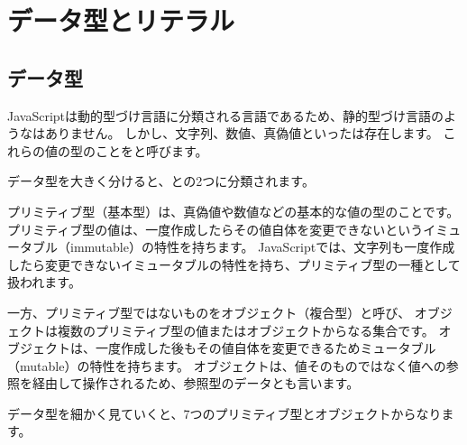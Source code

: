\hypertarget{data-type-and-literal}{%
\chapter{データ型とリテラル}\label{data-type-and-literal}}
\thispagestyle{frontheadings}

\hypertarget{data-type}{%
\section{データ型}\label{data-type}}

JavaScriptは動的型づけ言語に分類される言語であるため、静的型づけ言語のような\textbf{}はありません。
しかし、文字列、数値、真偽値といった\textbf{}は存在します。
これらの値の型のことを\textbf{}と呼びます。

データ型を大きく分けると、\textbf{}と\textbf{}の2つに分類されます。

プリミティブ型（基本型）は、真偽値や数値などの基本的な値の型のことです。
プリミティブ型の値は、一度作成したらその値自体を変更できないというイミュータブル（immutable）の特性を持ちます。
JavaScriptでは、文字列も一度作成したら変更できないイミュータブルの特性を持ち、プリミティブ型の一種として扱われます。

一方、プリミティブ型ではないものをオブジェクト（複合型）と呼び、
オブジェクトは複数のプリミティブ型の値またはオブジェクトからなる集合です。
オブジェクトは、一度作成した後もその値自体を変更できるためミュータブル（mutable）の特性を持ちます。
オブジェクトは、値そのものではなく値への参照を経由して操作されるため、参照型のデータとも言います。

データ型を細かく見ていくと、7つのプリミティブ型とオブジェクトからなります。

